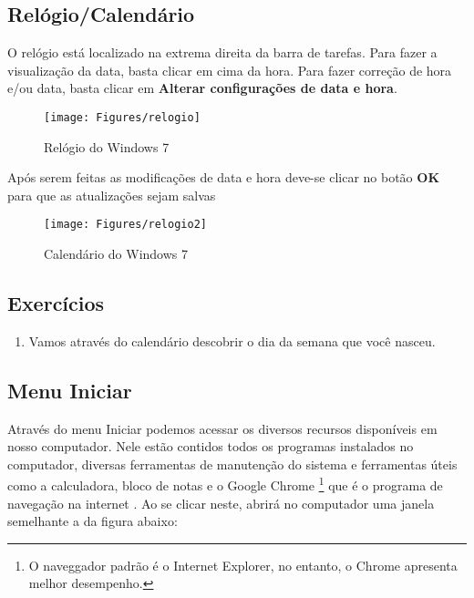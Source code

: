 \documentclass[hidelinks,12pt]{article}
\begin{document}
	  \vspace{1cm}
	  \hspace{-0.6cm}{\small Iniciar } \hspace{1cm}{\tiny Barra de Inicialização Rápida e Janelas Ativas e Inativas}
	  \hspace{1.2cm}{\small Área de Notificação}
	  \newpage
  
  \subsection{Relógio/Calendário}
	
	O relógio está localizado na extrema direita da barra de tarefas. Para fazer a visualização da data, basta clicar em cima da hora. Para fazer correção de hora e/ou data, basta clicar em {\bf Alterar configurações de data e hora}. 
	
	\begin{figure}[!hb]
		\centering
		\texttt{[image: Figures/relogio]}
		\caption{Relógio do Windows 7}
		\label{fig:relogio}
		
	\end{figure}
	
	Após serem feitas as modificações de data e hora deve-se clicar no botão {\bf OK} para que as atualizações sejam salvas
	
	\begin{figure}[!h]
		\centering
		\texttt{[image: Figures/relogio2]}
		\caption{Calendário do Windows 7}
		\label{fig:calendario}
		
	\end{figure}
	
	\newpage
	
	\subsection{Exercícios}
	\begin{enumerate}
		\item Vamos através do calendário descobrir o dia da semana que você nasceu.
	\end{enumerate}
	
	
	
	\newpage
	\subsection{Menu Iniciar}
	
	Através do menu Iniciar podemos acessar os diversos recursos disponíveis em nosso computador. Nele estão contidos todos os programas instalados no computador, diversas ferramentas de manutenção do sistema e ferramentas úteis como a calculadora, bloco de notas e o Google Chrome \footnote{O naveggador padrão é o Internet Explorer, no entanto, o Chrome apresenta melhor desempenho.} que é o programa de navegação na internet . Ao se clicar neste, abrirá no computador uma janela semelhante a da figura abaixo:
	
\end{document}
